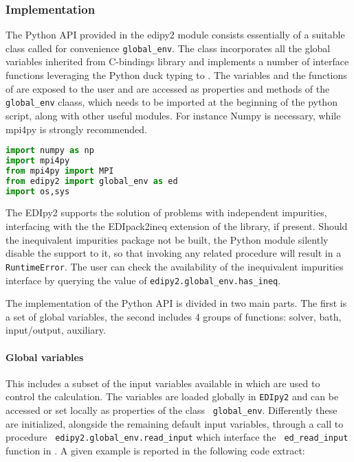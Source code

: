\documentclass[edipack2.tex]{subfiles}
\begin{document}
\subsubsection{Implementation}\label{sSecInteropEDIpyImplementation}
The Python API provided in the edipy2 module consists essentially of a
suitable class called for convenience {\tt global\_env}.
The class incorporates all the global variables inherited from \NAME
C-bindings library and implements a number of interface functions
leveraging the Python duck typing to \NAME.  
The variables and the functions of \NAME are exposed to the user and
are accessed as properties and
methods of the {\tt global\_env} claass, which needs to be imported at the beginning
of the python script, along with other useful modules. For instance Numpy is
necessary, while mpi4py is strongly recommended.

\begin{lstlisting}[language=python,  frame=lines]
import numpy as np
import mpi4py
from mpi4py import MPI
from edipy2 import global_env as ed
import os,sys
\end{lstlisting}

The EDIpy2 supports the solution of problems with independent
impurities, interfacing with the the EDIpack2ineq extension of the
library, if present. Should the inequivalent impurities package not be
built, the Python module silently disable the support to it, so that
invoking any related procedure  will result in a {\tt RuntimeError}.
The user can check the availability of the inequivalent impurities
interface by querying the value of  {\tt edipy2.global\_env.has\_ineq}.

The implementation of the Python API is divided in two main parts. The
first is a set of global variables, the second includes 4 groups of
functions: solver, bath, input/output, auxiliary. 

\paragraph{{\bf Global variables}}
This includes a subset of the input variables available in \NAME which
are used to control the calculation.
The variables are loaded globally in {\tt EDIpy2} and can be accessed
or set locally as properties of the class {\tt
  global\_env}. Differently these are initialized, alongside the remaining
default input variables, through a call to procedure {\tt
  edipy2.global\_env.read\_input} which interface the {\tt
  ed\_read\_input} function in \NAME. 
A given example is reported in the following code extract:
\end{document}
